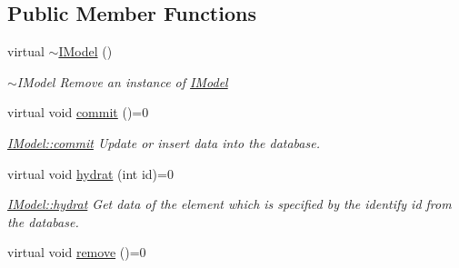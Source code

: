 \subsection*{Public Member Functions}
\begin{DoxyCompactItemize}
\item 
\hypertarget{classModels_1_1IModel_ab9c12f5b9ae86e00d0f2f7d8d349c4fa}{}virtual \hyperlink{classModels_1_1IModel_ab9c12f5b9ae86e00d0f2f7d8d349c4fa}{$\sim$\+I\+Model} ()\label{classModels_1_1IModel_ab9c12f5b9ae86e00d0f2f7d8d349c4fa}

\begin{DoxyCompactList}\small\item\em $\sim$\+I\+Model Remove an instance of \hyperlink{classModels_1_1IModel}{I\+Model} \end{DoxyCompactList}\item 
\hypertarget{classModels_1_1IModel_ab4bc529739a8d243222212590888be45}{}virtual void \hyperlink{classModels_1_1IModel_ab4bc529739a8d243222212590888be45}{commit} ()=0\label{classModels_1_1IModel_ab4bc529739a8d243222212590888be45}

\begin{DoxyCompactList}\small\item\em \hyperlink{classModels_1_1IModel_ab4bc529739a8d243222212590888be45}{I\+Model\+::commit} Update or insert data into the database. \end{DoxyCompactList}\item 
virtual void \hyperlink{classModels_1_1IModel_a7ce6def437f5e1f6a78ee1d67ca028e4}{hydrat} (int id)=0
\begin{DoxyCompactList}\small\item\em \hyperlink{classModels_1_1IModel_a7ce6def437f5e1f6a78ee1d67ca028e4}{I\+Model\+::hydrat} Get data of the element which is specified by the identify {\itshape id} from the database. \end{DoxyCompactList}\item 
\hypertarget{classModels_1_1IModel_a290473739e709321c818f4451e05e619}{}virtual void \hyperlink{classModels_1_1IModel_a290473739e709321c818f4451e05e619}{remove} ()=0\label{classModels_1_1IModel_a290473739e709321c818f4451e05e619}


\end{DoxyCompactItemize}
